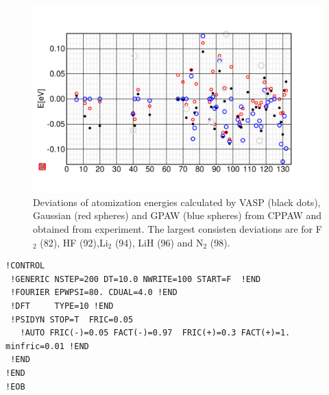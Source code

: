 \documentclass{book}
\begin{document}
\begin{figure}[h!]
\includegraphics[width=\linewidth]{Figs/151010benchmark/g2benchmark}
\caption{\label{fig:151010benchmark}Deviations of atomization energies
  calculated by VASP (black dots), Gaussian (red spheres) and GPAW
  (blue spheres) from CPPAW and obtained from experiment. The largest
  consisten deviations are for F$_2$ (82), HF (92),Li$_2$ (94), LiH
  (96) and N$_2$ (98). }
\end{figure}

{\tiny
\begin{verbatim}
!CONTROL
 !GENERIC NSTEP=200 DT=10.0 NWRITE=100 START=F  !END 
 !FOURIER EPWPSI=80. CDUAL=4.0 !END
 !DFT     TYPE=10 !END 
 !PSIDYN STOP=T  FRIC=0.05 
   !AUTO FRIC(-)=0.05 FACT(-)=0.97  FRIC(+)=0.3 FACT(+)=1. minfric=0.01 !END
 !END
!END
!EOB 
\end{verbatim}
}
\end{document}
